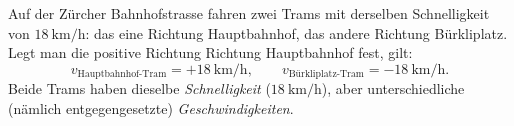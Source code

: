 \documentclass[addpoints,11pt,a4paper]{exam}
\begin{document}
\begin{beispielbox}
Auf der Zürcher Bahnhofstrasse fahren zwei Trams mit derselben
Schnelligkeit von $\SI{18}{\kilo\meter\per\hour}$: das eine Richtung
Hauptbahnhof, das andere Richtung Bürkliplatz. Legt man die positive
Richtung Richtung Hauptbahnhof fest, gilt:
\[
  v_{\text{Hauptbahnhof-Tram}} = +\SI{18}{\kilo\meter\per\hour},
  \qquad
  v_{\text{Bürkliplatz-Tram}} = -\SI{18}{\kilo\meter\per\hour}.
\]
Beide Trams haben dieselbe \emph{Schnelligkeit}
($\SI{18}{\kilo\meter\per\hour}$), aber unterschiedliche (nämlich
entgegengesetzte) \emph{Geschwindigkeiten}.

\begin{center}
\end{center}
\end{beispielbox}
\end{document}
